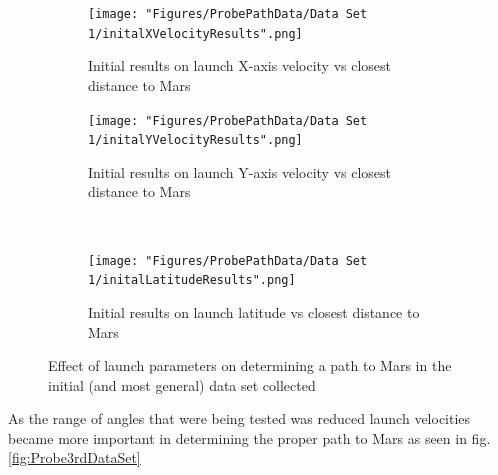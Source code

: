 \documentclass{article}
\begin{document}
                
                \begin{figure}[!ht]
                    \centering
                    \begin{subfigure}{0.5\textwidth}
                        \centering
                        \texttt{[image: "Figures/ProbePathData/Data Set 1/initalXVelocityResults".png]}
                        \caption{Initial results on launch X-axis velocity vs closest\\ distance to Mars}
                        \label{subFig:initXVel}
                    \end{subfigure}%
                    \begin{subfigure}{0.5\textwidth}
                        \centering
                        \texttt{[image: "Figures/ProbePathData/Data Set 1/initalYVelocityResults".png]}
                        \caption{Initial results on launch Y-axis velocity vs closest distance to Mars}
                    \end{subfigure}%
                    \\
                    \begin{subfigure}{0.5\textwidth}
                        \centering
                        \texttt{[image: "Figures/ProbePathData/Data Set 1/initalLatitudeResults".png]}
                        \caption{Initial results on launch latitude vs closest distance to Mars}
                        \label{subFig:initLat}
                    \end{subfigure}%

                    \caption{Effect of launch parameters on determining a path to Mars in the initial (and most general) data set collected}
                    \label{fig:ProbeInitialDataSet}
                \end{figure}


                \pagebreak

                As the range of angles that were being tested was reduced launch velocities became
                more important in determining the proper path to Mars as seen in fig.\ref{fig:Probe3rdDataSet}
\end{document}
